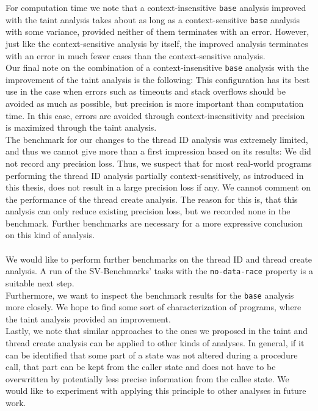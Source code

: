   For computation time we note that a context-insensitive \texttt{base} analysis improved with the taint analysis takes about as long as a context-sensitive \texttt{base} analysis with some variance, provided neither of them terminates with an error. However, just like the context-sensitive analysis by itself, the improved analysis terminates with an error in much fewer cases than the context-sensitive analysis.\\
  Our final note on the combination of a context-insensitive \texttt{base} analysis with the improvement of the taint analysis is the following: This configuration has its best use in the case when errors such as timeouts and stack overflows should be avoided as much as possible, but precision is more important than computation time. In this case, errors are avoided through context-insensitivity and precision is maximized through the taint analysis.\\
  The benchmark for our changes to the thread ID analysis was extremely limited, and thus we cannot give more than a first impression based on its results: We did not record any precision loss. Thus, we suspect that for most real-world programs performing the thread ID analysis partially context-sensitively, as introduced in this thesis, does not result in a large precision loss if any. We cannot comment on the performance of the thread create analysis. The reason for this is, that this analysis can only reduce existing precision loss, but we recorded none in the benchmark. Further benchmarks are necessary for a more expressive conclusion on this kind of analysis.\\
  \\
  We would like to perform further benchmarks on the thread ID and thread create analysis. A run of the SV-Benchmarks' tasks with the \texttt{no-data-race} property is a suitable next step.\\
  Furthermore, we want to inspect the benchmark results for the \texttt{base} analysis more closely. We hope to find some sort of characterization of programs, where the taint analysis provided an improvement.\\
  Lastly, we note that similar approaches to the ones we proposed in the taint and thread create analysis can be applied to other kinds of analyses. In general, if it can be identified that some part of a state was not altered during a procedure call, that part can be kept from the caller state and does not have to be overwritten by potentially less precise information from the callee state. We would like to experiment with applying this principle to other analyses in future work.\\

